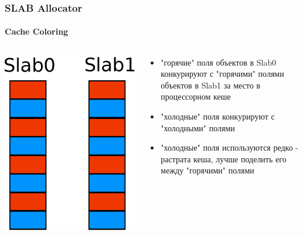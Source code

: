 \begin{frame}
\frametitle{SLAB Allocator}
\framesubtitle{Cache Coloring}

\begin{columns}[T]

  \begin{column}{.3\textwidth}
    \includegraphics[width=\linewidth]{slab-color0}
  \end{column}

  \begin{column}{.7\textwidth}
    \begin{itemize}
      \item "горячие" поля объектов в Slab0 конкурируют с "горячими" полями объектов в Slab1 за место в процессорном кеше
      \item "холодные" поля конкурируют с "холодными" полями
      \item "холодные" поля используются редко - растрата кеша, лучше поделить его между "горячими" полями
    \end{itemize}
  \end{column}

\end{columns}

\end{frame}

